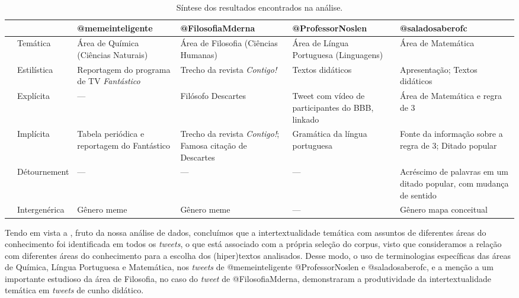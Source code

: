 \documentclass{textolivre}
\begin{document}
\begin{table}[h]
\centering
\caption{Síntese dos resultados encontrados na análise.}
\label{tbl01}
\small
\begin{tabularx}{\textwidth}{cl*{4}{p{}}}
\toprule
 & & @memeinteligente & @FilosofiaMderna & @ProfessorNoslen & @saladosaberofc \\
\midrule

\parbox[t]{2mm}{} & Temática & Área de Química (Ciências Naturais) & Área de Filosofia (Ciências Humanas) & Área de Língua Portuguesa (Linguagens) & Área de Matemática \\
 
 & Estilística & Reportagem do programa de TV \textit{Fantástico} & Trecho da revista \textit{Contigo!} & Textos didáticos & Apresentação;  Textos didáticos \\

 & Explícita & --- & Filósofo Descartes & Tweet com vídeo de participantes do BBB, linkado & Área de Matemática e  regra de 3 \\

 & Implícita & Tabela periódica e reportagem do Fantástico & Trecho da revista \textit{Contigo!};  Famosa citação de Descartes & Gramática da língua portuguesa & Fonte da informação sobre a regra de 3; Ditado popular \\

 & Détournement & --- & --- & --- & Acréscimo de palavras em um ditado popular, com mudança de sentido \\
\midrule{}
 & Intergenérica & Gênero meme & Gênero meme & --- & Gênero mapa conceitual \\
 
 \bottomrule
\end{tabularx}
\end{table}

Tendo em vista a , fruto da nossa análise de dados, concluímos que a intertextualidade temática com assuntos de diferentes áreas do conhecimento foi identificada em todos os \textit{tweets}, o que está associado com a própria seleção do corpus, visto que consideramos a relação com diferentes áreas do conhecimento para a escolha dos (hiper)textos analisados. Desse modo, o uso de terminologias específicas das áreas de Química, Língua Portuguesa e Matemática, nos \textit{tweets} de @memeinteligente @ProfessorNoslen e @saladosaberofc, e a menção a um importante estudioso da área de Filosofia, no caso do \textit{tweet} de @FilosofiaMderna, demonstraram a produtividade da intertextualidade temática em \textit{tweets} de cunho didático.
\end{document}
